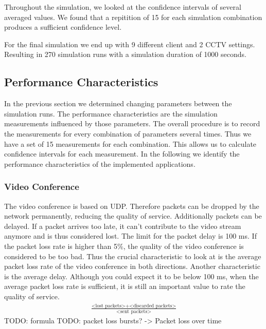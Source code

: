 \documentclass[
10pt, %
a4paper, %
oneside, %
headinclude,footinclude, %
BCOR5mm, %
]{scrartcl}
\begin{document}
Throughout the simulation, we looked at the confidence intervals of several averaged values. We found that a repitition of 15 for each simulation combination produces a sufficient confidence level. 

For the final simulation we end up with 9 different client and 2 CCTV settings. Resulting in 270 simulation runs with a simulation duration of 1000 seconds.  

\subsection{Performance Characteristics}
In the previous section we determined changing parameters between the simulation runs. The performance characteristics are the simulation measurements influenced by those parameters. The overall procedure is to record the measurements for every combination of parameters several times. Thus we have a set of 15 measurements for each combination. This allows us to calculate confidence intervals for each measurement. In the following we identify the performance characteristics of the implemented applications.

\subsubsection{Video Conference}
The video conference is based on UDP. Therefore packets can be dropped by the network permanently, reducing the quality of service. Additionally packets can be delayed. If a packet arrives too late, it can't contribute to the video stream anymore and is thus considered lost. The limit for the packet delay is 100 ms. If the packet loss rate is higher than 5\%, the quality of the video conference is considered to be too bad. Thus the crucial characteristic to look at is the average packet loss rate of the video conference in both directions. 
Another characteristic is the average delay. Although you could expect it to be below 100 ms, when the average packet loss rate is sufficient, it is still an important value to rate the quality of service. 
\begin{align*}
\frac{\text{<lost packets>} + \text{<discarded packets>}}{\text{<sent packets>}}
\end{align*}
TODO: formula
TODO: packet loss bursts? -> Packet loss over time
\end{document}
